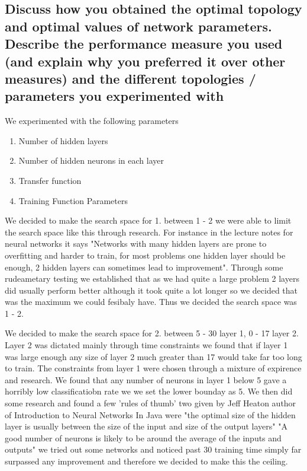 \documentclass[11pt]{article}
\begin{document}
\subsection{Discuss how you obtained the optimal topology and optimal values of network parameters. Describe the performance measure you used (and explain why you preferred it over other measures) and the different topologies / parameters you experimented with}

We experimented with the following parameters
\begin{enumerate}
  \item Number of hidden layers
  \item Number of hidden neurons in each layer
  \item Transfer function
  \item Training Function Parameters
\end{enumerate}

We decided to make the search space for 1. between 1 - 2 we were able to limit the search space like this through research. For instance in the lecture notes for neural networks it says "Networks with many hidden layers are prone to overfitting and harder to train, for most problems one hidden layer should be enough, 2 hidden layers can sometimes lead to improvement". Through some
rudeametary testing we established that as we had quite a large problem 2 layers did usually perform better although it took
quite a lot longer so we decided that was the maximum we could fesibaly have. Thus we decided the search space was 1 - 2.

We decided to make the search space for 2. between 5 - 30 layer 1, 0 - 17 layer 2. Layer 2 was dictated mainly through time
constraints we found that if layer 1 was large enough any size of layer 2 much greater than 17 would take far too long to train.
The constraints from layer 1 were chosen through a mixture of expirence and research. We found that any number of neurons in layer
1 below 5 gave a horribly low classificatiobn rate we we set the lower bounday as 5. We then did some research and found a few 'rules of thumb' two given by Jeff Heaton author of Introduction to Neural Networks In Java were "the optimal size of the hidden layer is usually between the size of the input and size of the output layers" "A good number of neurons is likely to be around the average of the inputs and outputs" we tried out some networks and noticed past 30 training time simply far surpassed any improvement and therefore we decided to make this the ceiling.
\end{document}
